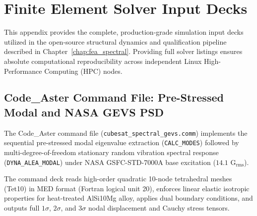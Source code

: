 
\chapter{Finite Element Solver Input Decks}
\label{app:fea_decks}

This appendix provides the complete, production-grade simulation input decks utilized in the open-source structural dynamics and qualification pipeline described in Chapter~\ref{chap:fea_spectral}. Providing full solver listings ensures absolute computational reproducibility across independent Linux High-Performance Computing (HPC) nodes.

\section{Code\_Aster Command File: Pre-Stressed Modal and NASA GEVS PSD}
\label{sec:deck_code_aster}

The Code\_Aster command file (\texttt{cubesat\_spectral\_gevs.comm}) implements the sequential pre-stressed modal eigenvalue extraction (\texttt{CALC\_MODES}) followed by multi-degree-of-freedom stationary random vibration spectral response (\texttt{DYNA\_ALEA\_MODAL}) under NASA GSFC-STD-7000A base excitation ($14.1\text{ G}_{\text{rms}}$). 

The command deck reads high-order quadratic 10-node tetrahedral meshes (Tet10) in MED format (Fortran logical unit 20), enforces linear elastic isotropic properties for heat-treated AlSi10Mg alloy, applies dual boundary conditions, and outputs full $1\sigma$, $2\sigma$, and $3\sigma$ nodal displacement and Cauchy stress tensors.

